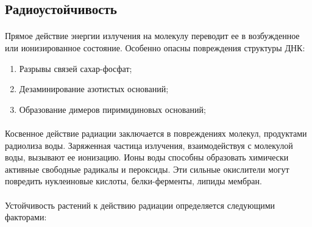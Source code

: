 
\subsection*{Радиоустойчивость}

\paragraph*{}Прямое действие энергии излучения на молекулу переводит ее в возбужденное или ионизированное состояние. Особенно опасны повреждения структуры ДНК:

\begin{enumerate}
\item Разрывы связей сахар-фосфат;
\item Дезаминирование азотистых оснований;
\item Образование димеров пиримидиновых оснований;
\end{enumerate}

\paragraph*{}Косвенное действие радиации заключается в повреждениях молекул, продуктами радиолиза воды. Заряженная частица излучения, взаимодействуя с молекулой воды, вызывают ее ионизацию. Ионы воды способны образовать химически активные свободные радикалы и пероксиды. Эти сильные окислители могут повредить нуклеиновые кислоты, белки-ферменты, липиды мембран.

\paragraph*{}Устойчивость растений к действию радиации определяется следующими факторами:


